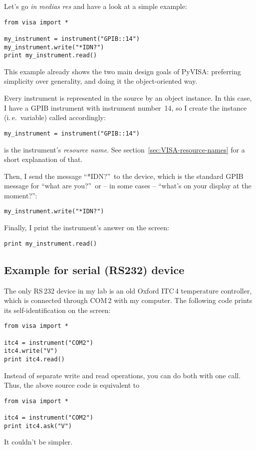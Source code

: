 \documentclass{howto}
\begin{document}
Let's go \emph{in medias res} and have a look at a simple example:
\begin{verbatim}
from visa import *

my_instrument = instrument("GPIB::14")
my_instrument.write("*IDN?")
print my_instrument.read()
\end{verbatim}
This example already shows the two main design goals of PyVISA: preferring
simplicity over generality, and doing it the object-oriented way.

Every instrument is represented in the source by an object instance.  In this case,
I have a GPIB instrument with instrument number~14, so I create the instance
(i.\,e.\ variable) called  accordingly:
\begin{verbatim}
my_instrument = instrument("GPIB::14")
\end{verbatim}
 is the instrument's \emph{resource name}.  See
section~\ref{sec:VISA-resource-names} for a short explanation of that.

Then, I send the message ``*IDN?''\ to the device, which is the standard GPIB
message for ``what are you?''\ or -- in some cases -- ``what's on your display
at the moment?'':
\begin{verbatim}
my_instrument.write("*IDN?")
\end{verbatim}
Finally, I print the instrument's answer on the screen:
\begin{verbatim}
print my_instrument.read()
\end{verbatim}


\subsection{Example for serial (RS232) device}

The only RS\,232 device in my lab is an old Oxford ITC\,4 temperature
controller, which is connected through COM\,2 with my computer.  The following
code prints its self-identification on the screen:
\begin{verbatim}
from visa import *

itc4 = instrument("COM2")
itc4.write("V")
print itc4.read()
\end{verbatim}
Instead of separate write and read operations, you can do both with one
 call.  Thus, the above source code is equivalent to
\begin{verbatim}
from visa import *

itc4 = instrument("COM2")
print itc4.ask("V")
\end{verbatim}
It couldn't be simpler.
\end{document}
